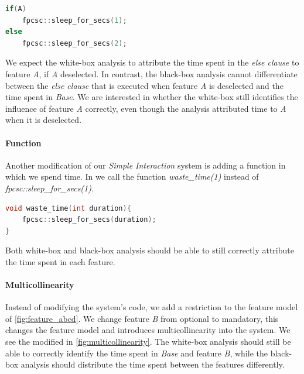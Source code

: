 \begin{minipage}{\linewidth}
    \begin{lstlisting}[language=C++,label={lst:else_case},escapechar=|]
if(A)
    fpcsc::sleep_for_secs(1); 
else
    fpcsc::sleep_for_secs(2);
    \end{lstlisting}
    \end{minipage}

We expect the white-box analysis to attribute the time spent in the \emph{else clause} to feature \emph{A}, if \emph{A} deselected. 
In contrast, 
the black-box analysis cannot differentiate between the \emph{else clause} that is executed when feature \emph{A} is deselected and the time spent in \emph{Base}.
We are interested in whether the white-box {\perfInfluenceModel} still identifies the influence of feature \emph{A} correctly, even though
the analysis attributed time to \emph{A} when it is deselected.

\paragraph{Function}\label{ground-truth:Function}
Another modification of our \emph{Simple Interaction} system is adding a function in which we spend time. 
In  we call the function \emph{waste\_time(1)} instead of \emph{fpcsc::sleep\_for\_secs(1)}.

\begin{minipage}{\linewidth}
\begin{lstlisting}[language=C++,label={lst:function},escapechar=|]
void waste_time(int duration){
    fpcsc::sleep_for_secs(duration);
}
\end{lstlisting}
\end{minipage}

Both white-box and black-box analysis should be able to still correctly attribute the time spent in each feature.

\paragraph{Multicollinearity}\label{ground-truth:Multicollinearity}
Instead of modifying the system's code, we add a restriction to the feature model of \autoref{fig:feature_abcd}. 
We change feature \emph{B} from optional to mandatory, this changes the feature model and 
introduces multicollinearity into the system. 
We see the modified in \autoref{fig:multicollinearity}.
The white-box analysis should still be able to correctly identify the time spent in \emph{Base} and feature \emph{B}, 
while the black-box analysis should distribute the time spent between the features differently.

